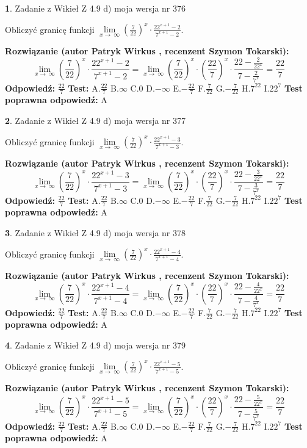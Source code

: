 \documentclass[12pt, a4paper]{article}
\theoremstyle{definition} %
\newtheorem{zad}{}
\newcommand{\zadStart}[1]{\begin{zad}#1\newline}
\newcommand{\zadStop}{\end{zad}}
\newcommand{\rozwStart}[2]{\noindent \textbf{Rozwiązanie (autor #1 , recenzent #2): }\newline}
\newcommand{\rozwStop}{\newline}
\newcommand{\odpStart}{\noindent \textbf{Odpowiedź:}\newline}
\newcommand{\odpStop}{\newline}
\newcommand{\testStart}{\noindent \textbf{Test:}\newline}
\newcommand{\testStop}{\newline}
\newcommand{\kluczStart}{\noindent \textbf{Test poprawna odpowiedź:}\newline}
\newcommand{\kluczStop}{\newline}
\begin{document}
\zadStart{Zadanie z Wikieł Z 4.9 d) moja wersja nr 376}


Obliczyć granicę funkcji  $\lim\limits_{x\to\ \infty}(\frac{7}{22})^{x}\cdot\frac{22^{x+1}-2}{7^{x+1}-2}$.
\zadStop
\rozwStart{Patryk Wirkus}{Szymon Tokarski}
$$\lim\limits_{x\to\ \infty}(\frac{7}{22})^{x}\cdot\frac{22^{x+1}-2}{7^{x+1}-2}=\lim\limits_{x\to\ \infty}(\frac{7}{22})^{x}\cdot(\frac{22}{7})^{x} \cdot \frac{22-\frac{2}{22^{x}}}{7-\frac{2}{7^{x}}} = \frac{22}{7}$$
\rozwStop
\odpStart
$\frac{22}{7}$
\odpStop
\testStart
A.$\frac{22}{7}$ B.$\infty$ C.$0$ D.$-\infty$ E.$-\frac{22}{7}$
F.$\frac{7}{22}$ G.$-\frac{7}{22}$
H.$7^{22}$
I.$22^{7}$
\testStop
\kluczStart
A
\kluczStop



\zadStart{Zadanie z Wikieł Z 4.9 d) moja wersja nr 377}


Obliczyć granicę funkcji  $\lim\limits_{x\to\ \infty}(\frac{7}{22})^{x}\cdot\frac{22^{x+1}-3}{7^{x+1}-3}$.
\zadStop
\rozwStart{Patryk Wirkus}{Szymon Tokarski}
$$\lim\limits_{x\to\ \infty}(\frac{7}{22})^{x}\cdot\frac{22^{x+1}-3}{7^{x+1}-3}=\lim\limits_{x\to\ \infty}(\frac{7}{22})^{x}\cdot(\frac{22}{7})^{x} \cdot \frac{22-\frac{3}{22^{x}}}{7-\frac{3}{7^{x}}} = \frac{22}{7}$$
\rozwStop
\odpStart
$\frac{22}{7}$
\odpStop
\testStart
A.$\frac{22}{7}$ B.$\infty$ C.$0$ D.$-\infty$ E.$-\frac{22}{7}$
F.$\frac{7}{22}$ G.$-\frac{7}{22}$
H.$7^{22}$
I.$22^{7}$
\testStop
\kluczStart
A
\kluczStop



\zadStart{Zadanie z Wikieł Z 4.9 d) moja wersja nr 378}


Obliczyć granicę funkcji  $\lim\limits_{x\to\ \infty}(\frac{7}{22})^{x}\cdot\frac{22^{x+1}-4}{7^{x+1}-4}$.
\zadStop
\rozwStart{Patryk Wirkus}{Szymon Tokarski}
$$\lim\limits_{x\to\ \infty}(\frac{7}{22})^{x}\cdot\frac{22^{x+1}-4}{7^{x+1}-4}=\lim\limits_{x\to\ \infty}(\frac{7}{22})^{x}\cdot(\frac{22}{7})^{x} \cdot \frac{22-\frac{4}{22^{x}}}{7-\frac{4}{7^{x}}} = \frac{22}{7}$$
\rozwStop
\odpStart
$\frac{22}{7}$
\odpStop
\testStart
A.$\frac{22}{7}$ B.$\infty$ C.$0$ D.$-\infty$ E.$-\frac{22}{7}$
F.$\frac{7}{22}$ G.$-\frac{7}{22}$
H.$7^{22}$
I.$22^{7}$
\testStop
\kluczStart
A
\kluczStop



\zadStart{Zadanie z Wikieł Z 4.9 d) moja wersja nr 379}


Obliczyć granicę funkcji  $\lim\limits_{x\to\ \infty}(\frac{7}{22})^{x}\cdot\frac{22^{x+1}-5}{7^{x+1}-5}$.
\zadStop
\rozwStart{Patryk Wirkus}{Szymon Tokarski}
$$\lim\limits_{x\to\ \infty}(\frac{7}{22})^{x}\cdot\frac{22^{x+1}-5}{7^{x+1}-5}=\lim\limits_{x\to\ \infty}(\frac{7}{22})^{x}\cdot(\frac{22}{7})^{x} \cdot \frac{22-\frac{5}{22^{x}}}{7-\frac{5}{7^{x}}} = \frac{22}{7}$$
\rozwStop
\odpStart
$\frac{22}{7}$
\odpStop
\testStart
A.$\frac{22}{7}$ B.$\infty$ C.$0$ D.$-\infty$ E.$-\frac{22}{7}$
F.$\frac{7}{22}$ G.$-\frac{7}{22}$
H.$7^{22}$
I.$22^{7}$
\testStop
\kluczStart
A
\kluczStop
\end{document}
